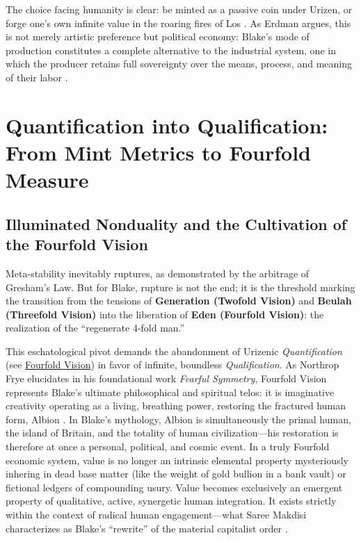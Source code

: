 \documentclass[
]{article}
\begin{document}
The choice facing humanity is clear: be minted as a passive coin under
Urizen, or forge one's own infinite value in the roaring fires of Los
\citep{blake1804jerusalem}. As Erdman argues, this is not merely
artistic preference but political economy: Blake's mode of production
constitutes a complete alternative to the industrial system, one in
which the producer retains full sovereignty over the means, process, and
meaning of their labor \citep{erdman1954prophet}.

\newpage

\section{Quantification into Qualification: From Mint Metrics to
Fourfold
Measure}\label{quantification-into-qualification-from-mint-metrics-to-fourfold-measure}

\subsection{Illuminated Nonduality and the Cultivation of the Fourfold
Vision}\label{sec-illuminated-nonduality}

Meta-stability inevitably ruptures, as demonstrated by the arbitrage of
Gresham's Law. But for Blake, rupture is not the end; it is the
threshold marking the transition from the tensions of \textbf{Generation
(Twofold Vision)} and \textbf{Beulah (Threefold Vision)} into the
liberation of \textbf{Eden (Fourfold Vision)}: the realization of the
``regenerate 4-fold man.''

This eschatological pivot demands the abandonment of Urizenic
\emph{Quantification} (see \hyperref[sec-four-levels-vision]{Fourfold
Vision}) in favor of infinite, boundless \emph{Qualification}. As
Northrop Frye elucidates in his foundational work \emph{Fearful
Symmetry}, Fourfold Vision represents Blake's ultimate philosophical and
spiritual telos: it is imaginative creativity operating as a living,
breathing power, restoring the fractured human form, Albion
\citep{frye1947fearful}. In Blake's mythology, Albion is simultaneously
the primal human, the island of Britain, and the totality of human
civilization---his restoration is therefore at once a personal,
political, and cosmic event. In a truly Fourfold economic system, value
is no longer an intrinsic elemental property mysteriously inhering in
dead base matter (like the weight of gold bullion in a bank vault) or
fictional ledgers of compounding usury. Value becomes exclusively an
emergent property of qualitative, active, synergetic human integration.
It exists strictly within the context of radical human engagement---what
Saree Makdisi characterizes as Blake's ``rewrite'' of the material
capitalist order \citep{makdisi2003william}.
\end{document}
